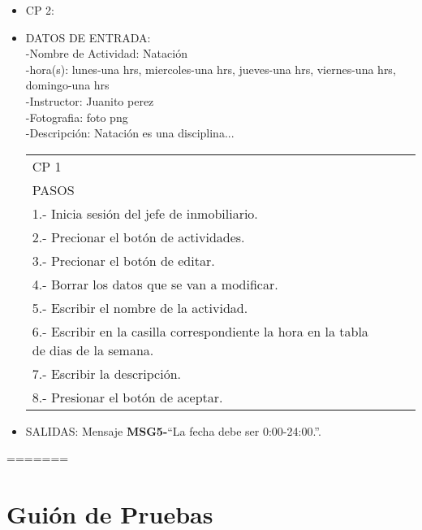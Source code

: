 \begin{itemize}
	\item CP 2:
	\item DATOS DE ENTRADA:\\
	-Nombre de Actividad: Natación\\
	-hora(s): lunes-una hrs, miercoles-una hrs, jueves-una hrs, viernes-una hrs, domingo-una hrs\\
	-Instructor: Juanito perez\\
	-Fotografia: foto png\\
	-Descripción: Natación es una disciplina...
	\begin{center}			
		\begin{tabular}{|l|l|l|l|}
			\hline
			CP 1\\
			PASOS\\
			\hline 1.- Inicia sesión del jefe de inmobiliario.\\
			\hline 2.- Precionar el botón de actividades.\\
			\hline 3.- Precionar el botón de editar.\\
			\hline 4.- Borrar los datos que se van a modificar.\\
			\hline 5.- Escribir el  nombre de la actividad.\\
			\hline 6.- Escribir en la casilla correspondiente la hora en la tabla
			de dias de la semana.\\
			\hline 7.- Escribir la descripción.\\
			\hline 8.- Presionar el botón de aceptar.\\
			\hline
		\end{tabular}
	\end{center}
	\item SALIDAS: Mensaje {\bf MSG5-}``La fecha debe ser 0:00-24:00.''.
	
\end{itemize}
=======
\section{Guión de Pruebas}

